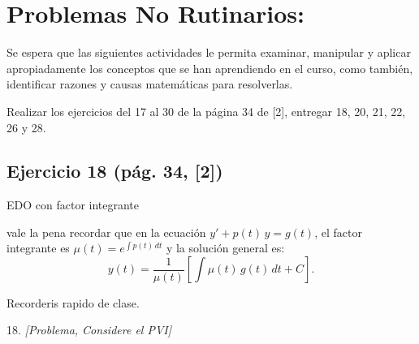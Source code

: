 
\section{Problemas No Rutinarios:}

Se espera que las siguientes actividades le permita examinar, manipular y aplicar
apropiadamente los conceptos que se han aprendiendo en el curso, como también,
identificar razones y causas matemáticas para resolverlas.


 Realizar los ejercicios del 17 al 30 de la página 34 de [2], entregar
18, 20, 21, 22, 26 y 28.

\subsection*{Ejercicio 18 \quad\normalfont\small(pág. 34, [2])}
EDO con factor integrante

vale la pena recordar que en la ecuaci\'on $y' + p(t)\,y = g(t)$, el factor
integrante es $\mu(t) = e^{\int p(t)\,dt}$ y la soluci\'on general es:
\[
  y(t) = \frac{1}{\mu(t)}\left[\int \mu(t)\,g(t)\,dt + C\right].
\]

Recorderis rapido de clase.

\begin{enunciado}{18.}
    \textit{[Problema, Considere el PVI]}
\end{enunciado}

